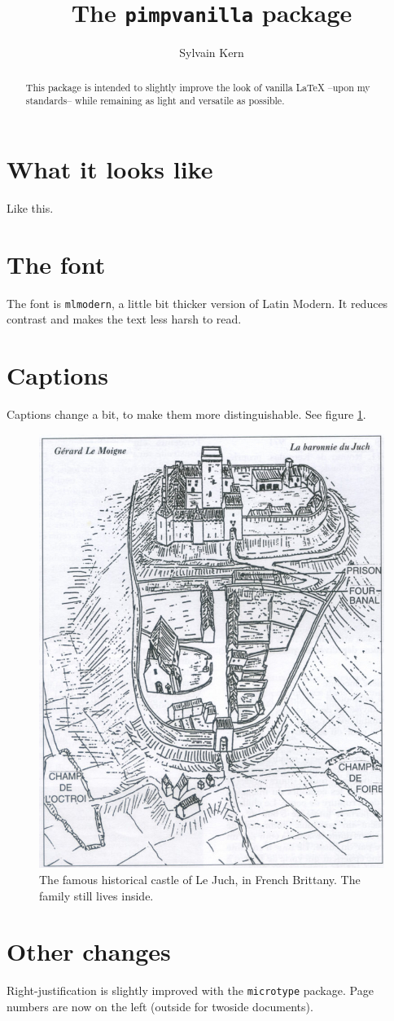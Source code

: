 \documentclass[12pt]{article}
\title{The \texttt{pimpvanilla} package}
\author{Sylvain Kern}
\begin{document}
\maketitle

\begin{abstract}
    This package is intended to slightly improve the look of vanilla \LaTeX{} --upon my standards-- while remaining as light and versatile as possible.
\end{abstract}

\section{What it looks like}

Like this. \lipsum[1-2]

\section{The font}

The font is \texttt{mlmodern}, a little bit thicker version of Latin Modern. It reduces contrast and makes the text less harsh to read.

\section{Captions}

Captions change a bit, to make them more distinguishable. See figure \ref{fig:juch}.

\begin{figure}
    \centering
    \includegraphics[width=.75\textwidth]{lejuch.png}
    \caption{The famous historical castle of Le Juch, in French Brittany. The family still lives inside. \lipsum[3]\label{fig:juch}}
\end{figure}


\section{Other changes}

Right-justification is slightly improved with the \texttt{microtype} package. Page numbers are now on the left (outside for twoside documents).
\end{document}
